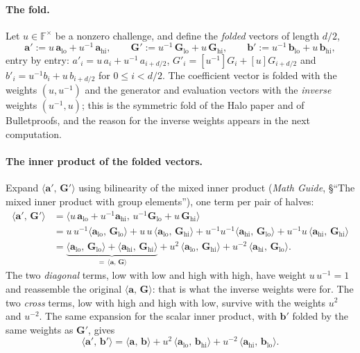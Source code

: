 \documentclass[11pt,a4paper]{article}
\theoremstyle{definition}
\newcommand{\F}{\mathbb{F}}
\newcommand{\ip}[2]{\langle #1,\, #2 \rangle}
\begin{document}
\paragraph{The fold.}
Let $u \in \F^\times$ be a nonzero challenge, and define the
\emph{folded} vectors of length $d/2$,
\begin{equation}\label{eq:ipa-fold-vectors}
\mathbf a' := u\,\mathbf a_{\mathrm{lo}} + u^{-1}\,\mathbf a_{\mathrm{hi}},
\qquad
\mathbf G' := u^{-1}\,\mathbf G_{\mathrm{lo}} + u\,\mathbf G_{\mathrm{hi}},
\qquad
\mathbf b' := u^{-1}\,\mathbf b_{\mathrm{lo}} + u\,\mathbf b_{\mathrm{hi}},
\end{equation}
entry by entry: $a'_i = u\,a_i + u^{-1}\,a_{i + d/2}$,
$G'_i = [u^{-1}]G_i + [u]G_{i + d/2}$ and $b'_i = u^{-1} b_i + u\,b_{i +
d/2}$ for $0 \le i < d/2$. The coefficient vector is folded with the
weights $(u, u^{-1})$ and the generator and evaluation vectors with the
\emph{inverse} weights $(u^{-1}, u)$; this is the symmetric fold of the
Halo paper and of Bulletproofs, and the reason for the inverse weights
appears in the next computation.

\paragraph{The inner product of the folded vectors.}
Expand $\ip{\mathbf a'}{\mathbf G'}$ using bilinearity of the mixed
inner product (\emph{Math Guide}, \S``The mixed inner product with group
elements''), one term per pair of halves:
\begin{align*}
\ip{\mathbf a'}{\mathbf G'}
 &= \ip{u\,\mathbf a_{\mathrm{lo}} + u^{-1}\mathbf a_{\mathrm{hi}}}
       {u^{-1}\mathbf G_{\mathrm{lo}} + u\,\mathbf G_{\mathrm{hi}}} \\
 &= u\,u^{-1}\ip{\mathbf a_{\mathrm{lo}}}{\mathbf G_{\mathrm{lo}}}
  + u\,u\,\ip{\mathbf a_{\mathrm{lo}}}{\mathbf G_{\mathrm{hi}}}
  + u^{-1}u^{-1}\ip{\mathbf a_{\mathrm{hi}}}{\mathbf G_{\mathrm{lo}}}
  + u^{-1}u\,\ip{\mathbf a_{\mathrm{hi}}}{\mathbf G_{\mathrm{hi}}} \\
 &= \underbrace{\ip{\mathbf a_{\mathrm{lo}}}{\mathbf G_{\mathrm{lo}}}
  + \ip{\mathbf a_{\mathrm{hi}}}{\mathbf G_{\mathrm{hi}}}}_{=\,
  \ip{\mathbf a}{\mathbf G}}
  + u^{2}\,\ip{\mathbf a_{\mathrm{lo}}}{\mathbf G_{\mathrm{hi}}}
  + u^{-2}\,\ip{\mathbf a_{\mathrm{hi}}}{\mathbf G_{\mathrm{lo}}} .
\end{align*}
The two \emph{diagonal} terms, low with low and high with high, have
weight $u\,u^{-1} = 1$ and reassemble the original
$\ip{\mathbf a}{\mathbf G}$: that is what the inverse weights were for.
The two \emph{cross} terms, low with high and high with low, survive with
the weights $u^2$ and $u^{-2}$. The same expansion for the scalar inner
product, with $\mathbf b'$ folded by the same weights as $\mathbf G'$,
gives
\[
\ip{\mathbf a'}{\mathbf b'}
 = \ip{\mathbf a}{\mathbf b}
  + u^{2}\,\ip{\mathbf a_{\mathrm{lo}}}{\mathbf b_{\mathrm{hi}}}
  + u^{-2}\,\ip{\mathbf a_{\mathrm{hi}}}{\mathbf b_{\mathrm{lo}}} .
\]
\end{document}

